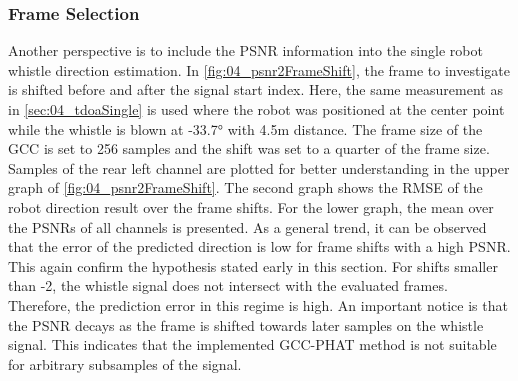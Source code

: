 \subsubsection*{Frame Selection}

Another perspective is to include the PSNR information into the single
robot whistle direction estimation.
In \cref{fig:04_psnr2FrameShift}, the frame to investigate is
shifted before and after the signal start index.
Here, the same measurement as in \cref{sec:04_tdoaSingle} is used where
the robot was positioned at the center point
while the whistle is blown at -33.7\si{\degree} with 4.5\si{\meter}
distance.
The frame size of the \ac{GCC} is set to 256 samples and the shift
was set to a quarter of the frame size.
Samples of the rear left channel are plotted for better understanding
in the upper graph of \cref{fig:04_psnr2FrameShift}.
The second graph shows the \ac{RMSE} of the robot direction result
over the frame shifts.
For the lower graph, the mean over the \acp{PSNR} of all channels
is presented.
As a general trend, it can be observed that the error of the predicted
direction is low for frame shifts with a high \ac{PSNR}. This again confirm the
hypothesis stated early in this section.
For shifts smaller than -2, the whistle signal does not intersect with the
evaluated frames. Therefore, the prediction error in this regime is high.
An important notice is that the \ac{PSNR} decays as the frame is shifted towards
later samples on the whistle signal. This indicates that the implemented
\ac{GCC-PHAT} method is not suitable for arbitrary subsamples of the signal.
